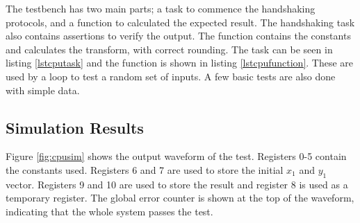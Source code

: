 The testbench has two main parts; a task to commence the handshaking protocols, and a function to calculated the expected result. 
The handshaking task also contains assertions to verify the output. 
The function contains the constants and calculates the transform, with correct rounding.
The task can be seen in listing \ref{lstcputask} and the function is shown in listing \ref{lstcpufunction}.
These are used by a loop to test a random set of inputs. 
A few basic tests are also done with simple data. 







\subsection{Simulation Results}

Figure \ref{fig:cpusim} shows the output waveform of the test. 
Registers 0-5 contain the constants used. 
Registers 6 and 7 are used to store the initial $x_1$ and $y_1$ vector. 
Registers 9 and 10 are used to store the result and register 8 is used as a temporary register. 
The global error counter is shown at the top of the waveform, indicating that the whole system passes the test. 



